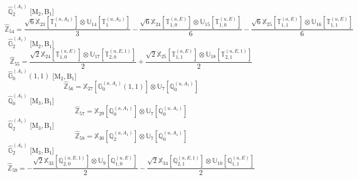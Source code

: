 \documentclass[fleqn,10pt,landscape]{article}
\begin{document}
\begin{itemize}
\begin{dmath*}
\end{dmath*}
\vspace{4mm}
\noindent {} $\,\,\,\hat{\mathbb{Q}}_{2}^{(A_{1})}$ [M$_{2}$,\,B$_{1}$]
\begin{dmath*}
\hat{\mathbb{Z}}_{54}=\frac{\sqrt{6} \mathbb{X}_{23}[\mathbb{T}_{1}^{(a,A_{2})}] \otimes\mathbb{U}_{14}[\mathbb{T}_{1}^{(u,A_{2})}]}{3} - \frac{\sqrt{6} \mathbb{X}_{24}[\mathbb{T}_{1,0}^{(a,E)}] \otimes\mathbb{U}_{15}[\mathbb{T}_{1,0}^{(u,E)}]}{6} - \frac{\sqrt{6} \mathbb{X}_{25}[\mathbb{T}_{1,1}^{(a,E)}] \otimes\mathbb{U}_{16}[\mathbb{T}_{1,1}^{(u,E)}]}{6}
\end{dmath*}
\vspace{4mm}
\noindent {} $\,\,\,\hat{\mathbb{G}}_{2}^{(A_{1})}$ [M$_{2}$,\,B$_{1}$]
\begin{dmath*}
\hat{\mathbb{Z}}_{55}=\frac{\sqrt{2} \mathbb{X}_{24}[\mathbb{T}_{1,0}^{(a,E)}] \otimes\mathbb{U}_{17}[\mathbb{T}_{2,0}^{(u,E,1)}]}{2} + \frac{\sqrt{2} \mathbb{X}_{25}[\mathbb{T}_{1,1}^{(a,E)}] \otimes\mathbb{U}_{18}[\mathbb{T}_{2,1}^{(u,E,1)}]}{2}
\end{dmath*}
\vspace{4mm}
\noindent {} $\,\,\,\hat{\mathbb{G}}_{0}^{(A_{1})}(1,1)$ [M$_{2}$,\,B$_{1}$]
\begin{dmath*}
\hat{\mathbb{Z}}_{56}=\mathbb{X}_{27}[\mathbb{G}_{0}^{(a,A_{1})}(1,1)] \otimes\mathbb{U}_{7}[\mathbb{Q}_{0}^{(u,A_{1})}]
\end{dmath*}
\vspace{4mm}
\noindent {} $\,\,\,\hat{\mathbb{Q}}_{0}^{(A_{1})}$ [M$_{3}$,\,B$_{1}$]
\begin{dmath*}
\hat{\mathbb{Z}}_{57}=\mathbb{X}_{29}[\mathbb{Q}_{0}^{(a,A_{1})}] \otimes\mathbb{U}_{7}[\mathbb{Q}_{0}^{(u,A_{1})}]
\end{dmath*}
\vspace{4mm}
\noindent {} $\,\,\,\hat{\mathbb{Q}}_{2}^{(A_{1})}$ [M$_{3}$,\,B$_{1}$]
\begin{dmath*}
\hat{\mathbb{Z}}_{58}=\mathbb{X}_{30}[\mathbb{Q}_{2}^{(a,A_{1})}] \otimes\mathbb{U}_{7}[\mathbb{Q}_{0}^{(u,A_{1})}]
\end{dmath*}
\vspace{4mm}
\noindent {} $\,\,\,\hat{\mathbb{G}}_{2}^{(A_{1})}$ [M$_{3}$,\,B$_{1}$]
\begin{dmath*}
\hat{\mathbb{Z}}_{59}=- \frac{\sqrt{2} \mathbb{X}_{33}[\mathbb{Q}_{2,0}^{(a,E,1)}] \otimes\mathbb{U}_{9}[\mathbb{Q}_{1,0}^{(u,E)}]}{2} - \frac{\sqrt{2} \mathbb{X}_{34}[\mathbb{Q}_{2,1}^{(a,E,1)}] \otimes\mathbb{U}_{10}[\mathbb{Q}_{1,1}^{(u,E)}]}{2}

\end{dmath*}
\end{itemize}
\end{document}
